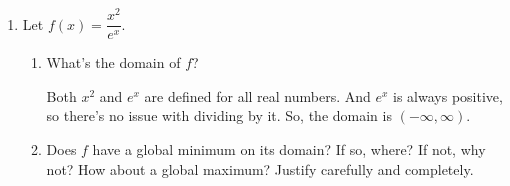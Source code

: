 \documentclass{article}
\theoremstyle{theorem}
\begin{document}
\begin{enumerate}
\begin{enumerate}
    \begin{solution}
      This is .  Here are two different ways to see this:
      \begin{itemize}
      \item \emph{Graphically:} We can see from our graph that the slope
        of the tangent line at $t = 30$ (corresponding to the year 2000)
        must be less steep than the slope of the secant line we drew.  We
        already found that the slope of this secant line was
        $-\frac{1}{3}$ million sparrows per year.

      \item \emph{In context:} If, in 2000, the sparrow population was declining at 350,000 sparrows per year, then it must have been declining at $\geq$ 350,000 sparrows per year for the entire time between 1970 and 2000 (because the sparrow population was decreasing at a slowing rate during this time). But, if it were decreasing at $\geq$ 350,000 sparrows per year for these 30 years, then the population must have fallen by at least (350,000 sparrows/year)(30 years) = 10,500,000 sparrows between 1970 and 2000. However, we are told that the population only fell by 10 million sparrows.
      \end{itemize}
    \end{solution}

  \end{enumerate}

\item {} 

  Let $f(x) = \dfrac{x^2}{e^x}$.

  \begin{enumerate}
  \item
    \begin{problem}[0.25in]
      What's the domain of $f$? 
    \end{problem}

    \begin{solution}
      Both $x^2$ and $e^x$ are defined for all real numbers. And $e^x$ is always positive, so there's no issue with dividing by it. So, the domain is $\boxed{(-\infty, \infty)}$.
    \end{solution}

  \item
    \begin{problem}[\vfill\newpage]
      Does $f$ have a global minimum on its domain? If so, where? If not, why not? How about a global maximum? Justify carefully and completely. 
    \end{problem}


\end{enumerate}
\end{enumerate}
\end{document}
